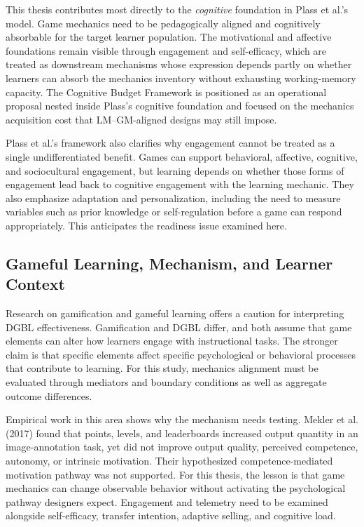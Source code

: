 \documentclass[12pt]{report}
\begin{document}
This thesis contributes most directly to the \textit{cognitive} foundation in Plass et al.'s model. Game mechanics need to be pedagogically aligned and cognitively absorbable for the target learner population. The motivational and affective foundations remain visible through engagement and self-efficacy, which are treated as downstream mechanisms whose expression depends partly on whether learners can absorb the mechanics inventory without exhausting working-memory capacity. The Cognitive Budget Framework is positioned as an operational proposal nested inside Plass's cognitive foundation and focused on the mechanics acquisition cost that LM--GM-aligned designs may still impose.

Plass et al.'s framework also clarifies why engagement cannot be treated as a single undifferentiated benefit. Games can support behavioral, affective, cognitive, and sociocultural engagement, but learning depends on whether those forms of engagement lead back to cognitive engagement with the learning mechanic. They also emphasize adaptation and personalization, including the need to measure variables such as prior knowledge or self-regulation before a game can respond appropriately. This anticipates the readiness issue examined here.

\subsection{Gameful Learning, Mechanism, and Learner Context}
Research on gamification and gameful learning offers a caution for interpreting DGBL effectiveness. Gamification and DGBL differ, and both assume that game elements can alter how learners engage with instructional tasks. The stronger claim is that specific elements affect specific psychological or behavioral processes that contribute to learning. For this study, mechanics alignment must be evaluated through mediators and boundary conditions as well as aggregate outcome differences.

Empirical work in this area shows why the mechanism needs testing. Mekler et al. (2017) found that points, levels, and leaderboards increased output quantity in an image-annotation task, yet did not improve output quality, perceived competence, autonomy, or intrinsic motivation. Their hypothesized competence-mediated motivation pathway was not supported. For this thesis, the lesson is that game mechanics can change observable behavior without activating the psychological pathway designers expect. Engagement and telemetry need to be examined alongside self-efficacy, transfer intention, adaptive selling, and cognitive load.
\end{document}
